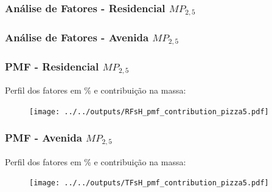 \begin{frame}
  \frametitle{Análise de Fatores - Residencial $MP_{2,5}$}        
  \begin{table}[H]
    \centering
    \tiny
    
  \end{table}
\end{frame}

\begin{frame}
  \frametitle{Análise de Fatores - Avenida $MP_{2,5}$}    
  \begin{table}[H]
    \centering
    \tiny
    
  \end{table}
\end{frame}

\begin{frame}
  \frametitle{PMF - Residencial $MP_{2,5}$}
  Perfil dos fatores em \% e contribuição na massa:
    \begin{figure}
      \centering
            \begin{minipage}[b]{0.4\linewidth}
              \tiny
              
            \end{minipage}
                  \hspace{3cm}
      \begin{minipage}[b]{0.3\linewidth}
        \texttt{[image: ../../outputs/RFsH\_pmf\_contribution\_pizza5.pdf]}

      \end{minipage}%
    \end{figure}
\end{frame}

\begin{frame}
  \frametitle{PMF - Avenida $MP_{2,5}$}
  Perfil dos fatores em \% e contribuição na massa:
    \begin{figure}
      \centering
            \begin{minipage}[b]{0.4\linewidth}
              \tiny
              
            \end{minipage}
                  \hspace{3cm}
      \begin{minipage}[b]{0.3\linewidth}
        \texttt{[image: ../../outputs/TFsH\_pmf\_contribution\_pizza5.pdf]}
      \end{minipage}%
    \end{figure}
\end{frame}

